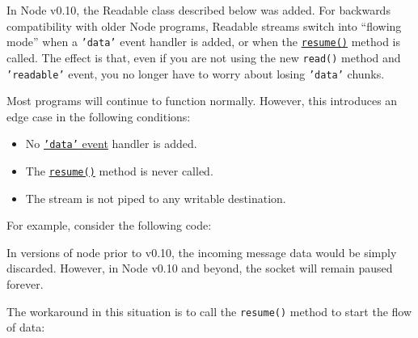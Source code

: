 In Node v0.10, the Readable class described below was added. For
backwards compatibility with older Node programs, Readable streams
switch into ``flowing mode'' when a \texttt{'data'} event handler is
added, or when the
\hyperref[stream\_readable\_resume]{\texttt{resume()}} method is called.
The effect is that, even if you are not using the new \texttt{read()}
method and \texttt{'readable'} event, you no longer have to worry about
losing \texttt{'data'} chunks.

Most programs will continue to function normally. However, this
introduces an edge case in the following conditions:

\begin{itemize}
\item
  No \hyperref[stream\_event\_data]{\texttt{'data'} event} handler is
  added.
\item
  The \hyperref[stream\_readable\_resume]{\texttt{resume()}} method is
  never called.
\item
  The stream is not piped to any writable destination.
\end{itemize}

For example, consider the following code:

\begin{Shaded}
\begin{Highlighting}[]
\NormalTok{(}

  \NormalTok{(}\NormalTok{, }\NormalTok{() \{}
    \NormalTok{(}\NormalTok{);}
  \NormalTok{\});}

\NormalTok{(}\NormalTok{);}
\end{Highlighting}
\end{Shaded}

In versions of node prior to v0.10, the incoming message data would be
simply discarded. However, in Node v0.10 and beyond, the socket will
remain paused forever.

The workaround in this situation is to call the \texttt{resume()} method
to start the flow of data:

